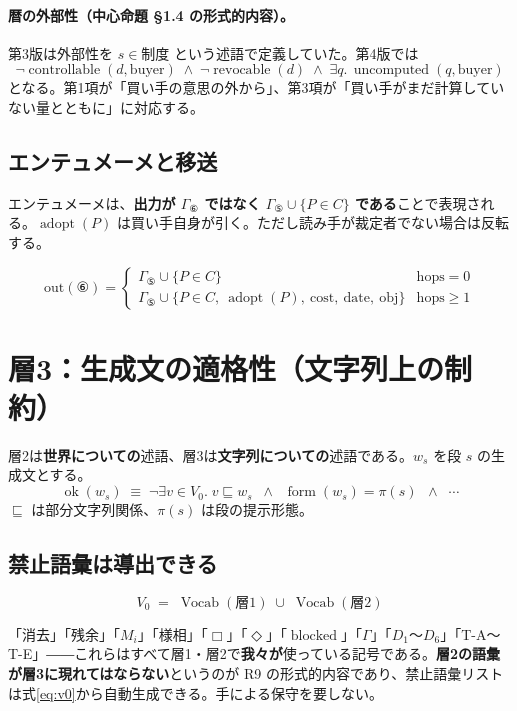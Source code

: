 \documentclass[11pt,a4paper]{article}
\newcommand{\blocked}{\operatorname{blocked}}
\newcommand{\adopt}{\operatorname{adopt}}
\newcommand{\uncomputed}{\operatorname{uncomputed}}
\newcommand{\controllable}{\operatorname{controllable}}
\newcommand{\revocable}{\operatorname{revocable}}
\newcommand{\Vocab}{\operatorname{Vocab}}
\newcommand{\form}{\operatorname{form}}
\newcommand{\ok}{\operatorname{ok}}
\begin{document}
\paragraph{暦の外部性（中心命題 \S1.4 の形式的内容）。}第3版は外部性を $s \in \text{制度}$ という述語で定義していた。第4版では
\[
\neg\controllable(d,\text{buyer}) \;\wedge\; \neg\revocable(d) \;\wedge\; \exists q.\,\uncomputed(q,\text{buyer})
\]
となる。第1項が「買い手の意思の外から」、第3項が「買い手がまだ計算していない量とともに」に対応する。

\subsection{エンテュメーメと移送}

エンテュメーメは、\textbf{出力が $\Gamma_{⑥}$ ではなく $\Gamma_{⑤} \cup \{P \in C\}$ である}ことで表現される。$\adopt(P)$ は買い手自身が引く。ただし読み手が裁定者でない場合は反転する。

\begin{equation}
\mathrm{out}(⑥) =
\begin{cases}
\Gamma_{⑤} \cup \{P \in C\} & \text{hops} = 0 \\[2pt]
\Gamma_{⑤} \cup \{P \in C,\ \adopt(P),\ \mathrm{cost},\ \mathrm{date},\ \mathrm{obj}\} & \text{hops} \geq 1
\end{cases}
\end{equation}

\section{層3：生成文の適格性（文字列上の制約）}

層2は\textbf{世界についての}述語、層3は\textbf{文字列についての}述語である。$w_s$ を段 $s$ の生成文とする。
\[
\ok(w_s) \;\equiv\; \neg\exists v \in V_0.\; v \sqsubseteq w_s \;\;\wedge\;\; \form(w_s) = \pi(s) \;\;\wedge\;\; \cdots
\]
$\sqsubseteq$ は部分文字列関係、$\pi(s)$ は段の提示形態。

\subsection{禁止語彙は導出できる}

\begin{equation}\label{eq:v0}
\boxed{\;V_0 \;=\; \Vocab(\text{層1}) \;\cup\; \Vocab(\text{層2})\;}
\end{equation}

「消去」「残余」「$M_i$」「様相」「$\Box$」「$\Diamond$」「$\blocked$」「$\Gamma$」「$D_1$〜$D_6$」「T-A〜T-E」――これらはすべて層1・層2で\textbf{我々が}使っている記号である。\textbf{層2の語彙が層3に現れてはならない}というのが R9 の形式的内容であり、禁止語彙リストは式\eqref{eq:v0}から自動生成できる。手による保守を要しない。
\end{document}
